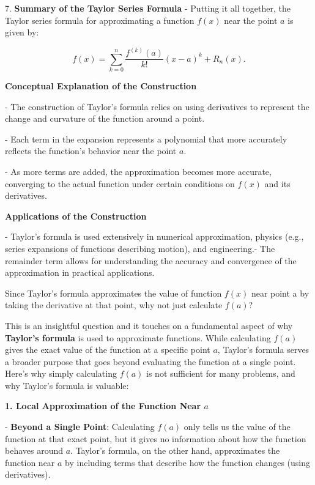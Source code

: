 \documentclass[a4paper,12pt]{book}
\begin{document}
7. \textbf{Summary of the Taylor Series Formula}
- Putting it all together, the Taylor series formula for approximating a function \( f(x) \) near the point \( a \) is given by:

     \[
     f(x) = \sum_{k=0}^{n} \frac{f^{(k)}(a)}{k!}(x - a)^k + R_n(x).
     \]

\textbf{Conceptual Explanation of the Construction}

- The construction of Taylor’s formula relies on using derivatives to represent the change and curvature of the function around a point.

- Each term in the expansion represents a polynomial that more accurately reflects the function’s behavior near the point \( a \).

- As more terms are added, the approximation becomes more accurate, converging to the actual function under certain conditions on \( f(x) \) and its derivatives.

\textbf{Applications of the Construction}

- Taylor’s formula is used extensively in numerical approximation, physics (e.g., series expansions of functions describing motion), and engineering.- The remainder term allows for understanding the accuracy and convergence of the approximation in practical applications.

\begin{bluebox}
Since Taylor's formula approximates the value of function \(f(x)\) near point a by taking the derivative at that point, why not just calculate \(f(a)\)?
\end{bluebox}

This is an insightful question and it touches on a fundamental aspect of why \textbf{Taylor's formula} is used to approximate functions. While calculating \( f(a) \) gives the exact value of the function at a specific point \( a \), Taylor’s formula serves a broader purpose that goes beyond evaluating the function at a single point. Here’s why simply calculating \( f(a) \) is not sufficient for many problems, and why Taylor's formula is valuable:

\textbf{1. Local Approximation of the Function Near \( a \)}

- \textbf{Beyond a Single Point}: Calculating \( f(a) \) only tells us the value of the function at that exact point, but it gives no information about how the function behaves around \( a \). Taylor's formula, on the other hand, approximates the function near \( a \) by including terms that describe how the function changes (using derivatives).
\end{document}
